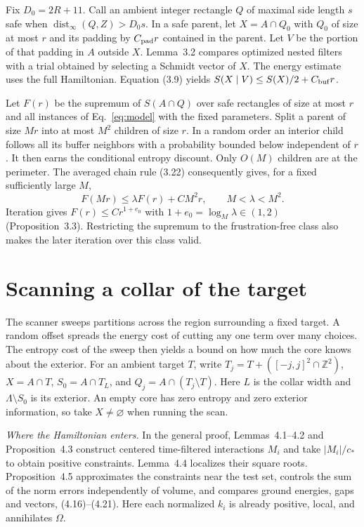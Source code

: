 \documentclass[aps,prb,onecolumn,10pt,nofootinbib]{revtex4-2}
\newcommand{\dist}{\operatorname{dist}}
\begin{document}
Fix $D_0=2R+11$. Call an ambient integer rectangle $Q$ of maximal side length $s$ safe when $\dist_\infty(Q,Z)>D_0s$. In a safe parent, let $X=A\cap Q_0$ with $Q_0$ of size at most $r$ and its padding by $C_{\rm pad}r$ contained in the parent. Let $V$ be the portion of that padding in $A$ outside $X$. Lemma~3.2 compares optimized nested filters with a trial obtained by selecting a Schmidt vector of $X$. The energy estimate uses the full Hamiltonian. Equation (3.9) yields $S(X\mid V)\le S(X)/2+C_{\rm buf}r$.

Let $F(r)$ be the supremum of $S(A\cap Q)$ over safe rectangles of size at most $r$ and all instances of Eq.~\eqref{eq:model} with the fixed parameters. Split a parent of size $Mr$ into at most $M^2$ children of size $r$. In a random order an interior child follows all its buffer neighbors with a probability bounded below independent of $r$. It then earns the conditional entropy discount. Only $O(M)$ children are at the perimeter. The averaged chain rule (3.22) consequently gives, for a fixed sufficiently large $M$,
\begin{equation}
 F(Mr)\le\lambda F(r)+C M^2r,\qquad M<\lambda<M^2 .
 \label{eq:box}
\end{equation}
Iteration gives $F(r)\le C r^{1+e_0}$ with $1+e_0=\log_M\lambda\in(1,2)$ (Proposition~3.3). Restricting the supremum to the frustration-free class also makes the later iteration over this class valid.

\section{Scanning a collar of the target}\label{sec:scan}

The scanner sweeps partitions across the region surrounding a fixed target. A random offset spreads the energy cost of cutting any one term over many choices. The entropy cost of the sweep then yields a bound on how much the core knows about the exterior. For an ambient target $T$, write $T_j=T+([-j,j]^2\cap\mathbb Z^2)$, $X=A\cap T$, $S_0=A\cap T_L$, and $Q_j=A\cap(T_j\setminus T)$. Here $L$ is the collar width and $\Lambda\setminus S_0$ is its exterior. An empty core has zero entropy and zero exterior information, so take $X\ne\varnothing$ when running the scan.

\emph{Where the Hamiltonian enters.}
In the general proof, Lemmas~4.1--4.2 and Proposition~4.3 construct centered time-filtered interactions $M_i$ and take $|M_i|/c_*$ to obtain positive constraints. Lemma~4.4 localizes their square roots. Proposition~4.5 approximates the constraints near the test set, controls the sum of the norm errors independently of volume, and compares ground energies, gaps and vectors, (4.16)--(4.21). Here each normalized $k_i$ is already positive, local, and annihilates $\Omega$.
\end{document}
